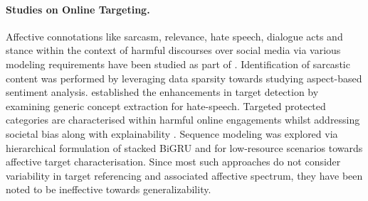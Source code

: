 \documentclass[11pt]{article}
\begin{document}
\paragraph{\bf Studies on Online Targeting.}
Affective connotations like sarcasm, relevance, hate speech, dialogue acts and stance within the context of harmful discourses over social media via various modeling requirements have been studied as part of \cite{zain2017,Gautam_Mathur_Gosangi_Mahata_Sawhney_Shah_2020,ousidhoum-etal-2019-multilingual}. 
Identification of sarcastic content was performed  by leveraging data sparsity \cite{Zainuddin2019HateCO} towards studying aspect-based sentiment analysis. \citet{shvets-etal-2021-targets} established the enhancements in target detection by examining generic concept extraction for hate-speech. Targeted protected categories are characterised within harmful online engagements whilst addressing societal bias along with explainability \cite{sap-etal-2020-social,mathew2020hatexplain}.
Sequence modeling was explored via hierarchical formulation of stacked BiGRU \cite{ma-etal-2018-joint} and for low-resource scenarios \cite{mitchell-etal-2013-open} towards affective target characterisation. 
Since most such approaches do not consider variability in target referencing and associated affective spectrum, they have been noted \cite{shvets-etal-2021-targets} to be ineffective towards generalizability.
\end{document}

